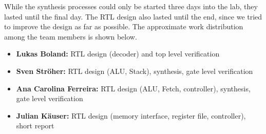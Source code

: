 While the synthesis processes could only be started three days into the lab, they lasted until the final day. The RTL design also lasted until the end, since we tried to improve the design as far as possible. The approximate work distribution among the team members is shown below.

\begin{itemize}
\item \textbf{Lukas Boland:} RTL design (decoder) and top level verification
\item \textbf{Sven Str\"oher:} RTL design (ALU, Stack), synthesis, gate level verification
\item \textbf{Ana Carolina Ferreira:} RTL design (ALU, Fetch, controller), synthesis, gate level verification
\item \textbf{Julian K\"auser:} RTL design (memory interface, register file, controller), short report
\end{itemize}



